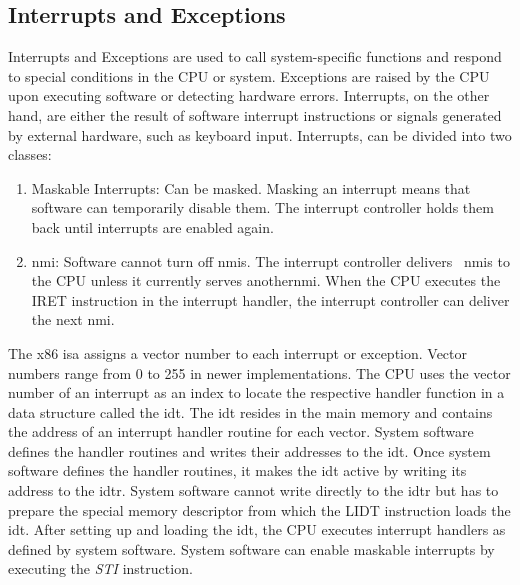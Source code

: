 \subsection{Interrupts and Exceptions}
\label{sec:state:technical:interrupts}
Interrupts and Exceptions are used to call system-specific functions and respond
to special conditions in the CPU or system. Exceptions are raised by the CPU
upon executing software or detecting hardware errors. Interrupts, on the other
hand, are either the result of software interrupt instructions or signals
generated by external hardware, such as keyboard input.
Interrupts, can be divided into two classes:
\begin{enumerate}
  \item Maskable Interrupts: Can be masked. Masking an interrupt means that
    software can temporarily disable them. The interrupt controller holds
    them back until interrupts are enabled again.
  \item \Gls{nmi}: Software cannot turn off \glspl{nmi}. The interrupt
    controller delivers~ \glspl{nmi} to the CPU unless it currently serves
    another\gls{nmi}. When the CPU executes the IRET instruction in the
    interrupt handler, the interrupt controller can deliver the next \gls{nmi}.
\end{enumerate}

The x86 \gls{isa} assigns a vector number to each interrupt or exception. Vector
numbers range from 0 to 255 in newer implementations. The CPU uses the vector
number of an interrupt as an index to locate the respective handler function in
a data structure called the \gls{idt}. The \gls{idt} resides in the main memory
and contains the address of an interrupt handler routine for each vector. System
software defines the handler routines and writes their addresses to the
\gls{idt}. Once system software defines the handler routines, it makes the
\gls{idt} active by writing its address to the \gls{idtr}. System software
cannot write directly to the \gls{idtr} but has to prepare the special memory
descriptor from which the LIDT instruction loads the \gls{idt}. After setting up
and loading the \gls{idt}, the CPU executes interrupt handlers as defined by
system software. System software can enable maskable interrupts by executing the
\textit{STI} instruction. \\

